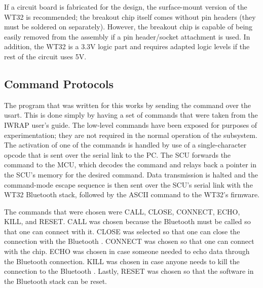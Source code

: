 If a circuit board is fabricated for the design, the surface-mount version of 
the WT32 is recommended; the breakout chip itself comes without pin headers 
(they must be soldered on separately). However, the breakout chip is capable of
 being easily removed from the assembly if a pin header/socket attachment is 
used. In addition, the WT32 is a 3.3V logic part and requires adapted logic 
levels if the rest of the circuit uses 5V. 

\subsection{Command Protocols}
The program that was written for this works by sending the command over the
 usart.  This is done simply by having a set of commands that were taken from 
the IWRAP user's guide. The low-level commands have been exposed for purposes
of experimentation; they are not required in the normal operation of the 
subsystem. The activation of one of the commands is handled by use of a
single-character opcode that is sent over the serial link to the PC. The SCU
forwards the command to the MCU, which decodes the command and relays back a
pointer in the SCU's memory for the desired command. Data transmission is 
halted and the command-mode escape sequence is then sent over the SCU's serial
link with the WT32 Bluetooth \textregistered stack, followed by the ASCII command to the WT32's firmware. 
 
  The commands that were chosen were CALL, CLOSE, CONNECT, ECHO, KILL, and
 RESET.  CALL was chosen because the Bluetooth \textregistered must be called so that one can
 connect with it.  CLOSE was selected so that one can close the connection 
with the Bluetooth \textregistered.  CONNECT was chosen so that one can connect with the chip.
  ECHO was chosen in case someone needed to echo data through the Bluetooth \textregistered
 connection.  KILL was chosen in case anyone needs to kill the connection to
 the Bluetooth \textregistered.  Lastly, RESET was chosen so that the software in the Bluetooth \textregistered stack
 can be reset. 
